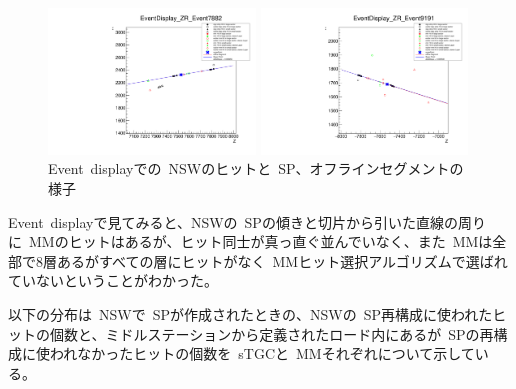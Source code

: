 \begin{figure}[H]
  \begin{minipage}[b]{0.45\linewidth}
      \centering
      \includegraphics[clip, width=5.5cm]{fig/5/EventDisplay_7882_ZR_withMM.pdf}
  \end{minipage}
    \begin{minipage}[b]{0.45\linewidth}
      \centering
      \includegraphics[clip, width=5.5cm]{fig/5/EventDisplay_9191_ZR_withMM.pdf}
  \end{minipage}
  \caption{Event~displayでの~NSWのヒットと~SP、オフラインセグメントの様子}\label{fig:5-10}
\end{figure}

Event~displayで見てみると、NSWの~SPの傾きと切片から引いた直線の周りに~MMのヒットはあるが、ヒット同士が真っ直ぐ並んでいなく、また~MMは全部で8層あるがすべての層にヒットがなく~MMヒット選択アルゴリズムで選ばれていないということがわかった。


以下の分布は~NSWで~SPが作成されたときの、NSWの~SP再構成に使われたヒットの個数と、ミドルステーションから定義されたロード内にあるが~SPの再構成に使われなかったヒットの個数を~sTGCと~MMそれぞれについて示している。

